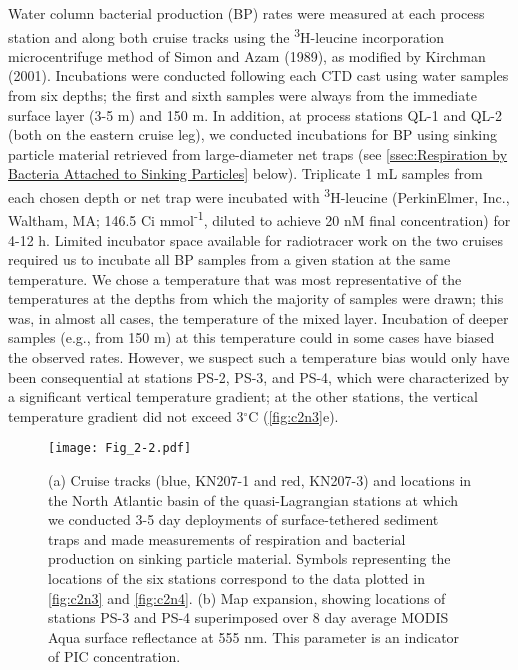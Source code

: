 Water column bacterial production (BP) rates were measured at each process station and along both cruise tracks using the \textsuperscript{3}H-leucine incorporation microcentrifuge method of Simon and Azam (1989), as modified by Kirchman (2001). Incubations were conducted following each CTD cast using water samples from six depths; the first and sixth samples were always from the immediate surface layer (3-5 m) and 150 m. In addition, at process stations QL-1 and QL-2 (both on the eastern cruise leg), we conducted incubations for BP using sinking particle material retrieved from large-diameter net traps (see \autoref{ssec:Respiration by Bacteria Attached to Sinking Particles} below). Triplicate 1 mL samples from each chosen depth or net trap were incubated with \textsuperscript{3}H-leucine (PerkinElmer, Inc., Waltham, MA; 146.5 Ci mmol\textsuperscript{-1}, diluted to achieve 20 nM final concentration) for 4-12 h. Limited incubator space available for radiotracer work on the two cruises required us to incubate all BP samples from a given station at the same temperature. We chose a temperature that was most representative of the temperatures at the depths from which the majority of samples were drawn; this was, in almost all cases, the temperature of the mixed layer. Incubation of deeper samples (e.g., from 150 m) at this temperature could in some cases have biased the observed rates. However, we suspect such a temperature bias would only have been consequential at stations PS-2, PS-3, and PS-4, which were characterized by a significant vertical temperature gradient; at the other stations, the vertical temperature gradient did not exceed 3$^{\circ}$C (\autoref{fig:c2n3}e).

\begin{SCfigure}[0.5][!bh]
\centering
\texttt{[image: Fig\_2-2.pdf]}
\caption[Cruise tracks and sampling locations referenced in \autoref{chap2}.]{(a) Cruise tracks (blue, KN207-1 and red, KN207-3) and locations in the North Atlantic basin of the quasi-Lagrangian stations at which we conducted 3-5 day deployments of surface-tethered sediment traps and made measurements of respiration and bacterial production on sinking particle material. Symbols representing the locations of the six stations correspond to the data plotted in \autoref{fig:c2n3} and \autoref{fig:c2n4}. (b) Map expansion, showing locations of stations PS-3 and PS-4 superimposed over 8 day average MODIS Aqua surface reflectance at 555 nm. This parameter is an indicator of PIC concentration.}
\label{fig:c2n2}
\end{SCfigure}


